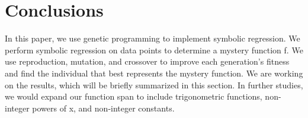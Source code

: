 
\section{Conclusions}
\label{sec:concl}



In this paper, we use genetic programming to implement symbolic regression. We perform symbolic regression on data points to determine a mystery function f. We use reproduction, mutation, and crossover to improve each generation's fitness and find the individual that best represents the mystery function. We are working on the results, which will be briefly summarized in this section. In further studies, we would expand our function span to include trigonometric functions, non-integer powers of x, and non-integer constants. 
